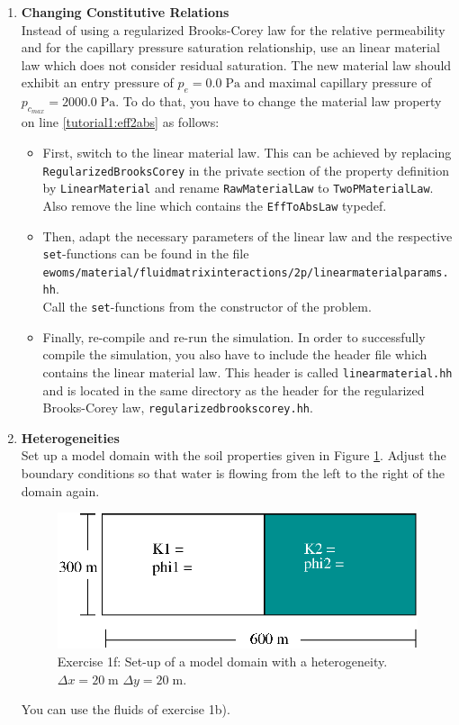 \begin{enumerate}
\item \textbf{Changing Constitutive Relations} \\
  Instead of using a regularized Brooks-Corey law for the relative
  permeability and for the capillary pressure saturation relationship,
  use an linear material law which does not consider residual
  saturation. The new material law should exhibit an entry pressure of
  $p_e = 0.0\;\text{Pa}$ and maximal capillary pressure of
  $p_{c_{max}} = 2000.0\;\text{Pa}$. To do that, you have to change
  the material law property on line
  \ref{tutorial1:eff2abs} as follows:
\begin{itemize}
\item First, switch to the linear material law. This can be achieved
  by replacing \texttt{RegularizedBrooksCorey} in the private section
  of the property definition by \texttt{LinearMaterial} and rename
  \texttt{RawMaterialLaw} to \texttt{TwoPMaterialLaw}. Also remove the
  line which contains the \texttt{EffToAbsLaw} typedef.
\item Then, adapt the necessary parameters of the linear law and the
  respective \texttt{set}-functions can be found in the file
  \texttt{ewoms/material/fluidmatrixinteractions/2p/linearmaterialparams.hh}.\\
  Call the \texttt{set}-functions from the constructor of the problem.
\item Finally, re-compile and re-run the simulation. In order to
  successfully compile the simulation, you also have to include the
  header file which contains the linear material law. This header is
  called \texttt{linearmaterial.hh} and is located in the same
  directory as the header for the regularized Brooks-Corey law,
  \texttt{regularizedbrookscorey.hh}.
\end{itemize}

\item \textbf{Heterogeneities}  \\
  Set up a model domain with the soil properties given in Figure
  \ref{tutorial1:exercise1_d}. Adjust the boundary conditions
  so that water is flowing from the left to the right of the domain again.
\begin{figure}[ht]
\centering
\includegraphics[width=0.5\linewidth,keepaspectratio]{EPS/exercise1_c.eps}
\caption{Exercise 1f: Set-up of a model domain with a heterogeneity. $\Delta x = 20 \;\text{m}$ $\Delta y = 20\;\text{m}$.}\label{tutorial1:exercise1_d}
\end{figure}
You can use the fluids of exercise 1b).


\end{enumerate}
